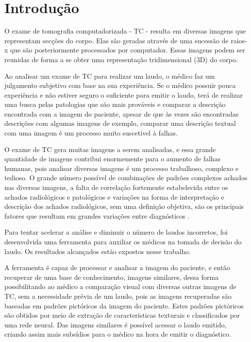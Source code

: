 \chapter{Introdução}

O exame de tomografia computadorizada - TC - resulta em diversas imagens que representam secções do corpo. Elas são geradas através de uma sucessão de raios-x que são posteriormente processados por computador. Essas imagens podem ser reunidas de forma a se obter uma representação tridimensional (3D) do corpo.

Ao analisar um exame de TC para realizar um laudo, o médico faz um julgamento subjetivo com base na sua experiência. Se o médico possuir pouca experiência e não estiver seguro o suficiente para emitir o laudo, terá de realizar uma busca pelas patologias que são mais prováveis e comparar a descrição encontrada com a imagem do paciente, apesar de que às vezes são encontradas descrições com algumas imagens de exemplo, comparar uma descrição textual com uma imagem é um processo muito suscetível à falhas.

O exame de TC gera muitas imagens a serem analisadas, e essa grande quantidade de imagens contribui enormemente para o aumento de falhas humanas, pois analisar diversas imagens é um processo trabalhoso, complexo e tedioso. O grande número possível de combinações de padrões complexos achados nas diversas imagens, a falta de correlação fortemente estabelecida entre os achados radiológicos e patológicos e variações na forma de interpretação e descrição dos achados radiológicos, sem uma definição objetiva, são os principais fatores que resultam em grandes variações entre diagnósticos \cite{uchiyama}.

Para tentar acelerar a análise e diminuir o número de laudos incorretos, foi desenvolvida uma ferramenta para auxiliar os médicos na tomada de decisão do laudo. Os resultados alcançados estão expostos nesse trabalho.

A ferramenta é capaz de processar e analisar a imagem do paciente, e então recuperar de uma base de conhecimento, imagens similares, dessa forma possibilitando ao médico a comparação visual com diversas outras imagens de TC, sem a necessidade prévia de um laudo, pois as imagens recuperadas são baseadas em padrões pictóricos da imagem do paciente. Estes padrões pictóricos são obtidos por meio de extração de características texturais e classificados por uma rede neural. Das imagens similares é possível acessar o laudo emitido, criando assim mais subsídios para o médico na hora de emitir o diagnóstico.

